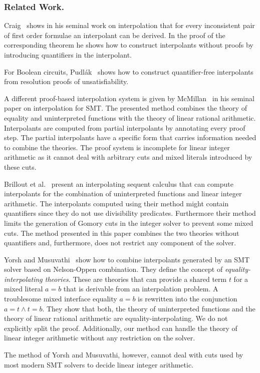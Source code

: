 \subsubsection*{Related Work.}

\begin{techreport}
Craig~\cite{Craig2011} shows in his seminal work on interpolation that for
every inconsistent pair of first order formulae an interpolant can be
derived. In the proof of the corresponding theorem he shows how to construct
interpolants without proofs by introducing quantifiers in the interpolant.
\end{techreport}
For Boolean circuits, Pudl\'ak~\cite{DBLP:journals/jsyml/Pudlak97} shows how
to construct quantifier-free interpolants from resolution proofs of
unsatisfiability.
\begin{techreport}

\end{techreport}
%
A different proof-based interpolation system is given by
McMillan~\cite{DBLP:conf/tacas/McMillan04} in his seminal paper on
interpolation for SMT. The presented method combines the theory of equality
and uninterpreted functions with the theory of linear rational
arithmetic. Interpolants are computed from partial interpolants by annotating
every proof step. The partial interpolants have a specific form that carries
information needed to combine the theories. The proof system is incomplete for
linear integer arithmetic as it cannot deal with arbitrary cuts and mixed
literals introduced by these cuts.

Brillout et al.~\cite{DBLP:conf/vmcai/BrilloutKRW11} present an interpolating
sequent calculus that can compute interpolants for the combination of
uninterpreted functions and linear integer arithmetic. The interpolants
computed using their method might contain quantifiers since they do not use
divisibility predicates. Furthermore their method limits the generation of
Gomory cuts in the integer solver to prevent some mixed cuts. The method
presented in this paper combines the two theories without quantifiers and,
furthermore, does not restrict any component of the solver.

Yorsh and Musuvathi~\cite{Yorsh2005} show how to combine interpolants
generated by an SMT solver based on Nelson-Oppen combination. They define the
concept of \emph{equality-interpolating theories}. These are theories that
can provide a shared term $t$ for 
a mixed literal $a=b$ that is derivable from an interpolation problem.
A troublesome mixed interface equality $a=b$ is rewritten into the
conjunction $a=t\land t=b$. They show that both, the theory of uninterpreted
functions and the theory of linear rational arithmetic are
equality-interpolating. We do not explicitly split the proof.
Additionally, our method can handle the
theory of linear integer arithmetic without any restriction on the solver. 
\begin{techreport}
The method of Yorsh and Musuvathi, however, cannot deal with cuts used by most
modern SMT solvers to decide linear integer arithmetic.
\end{techreport}

